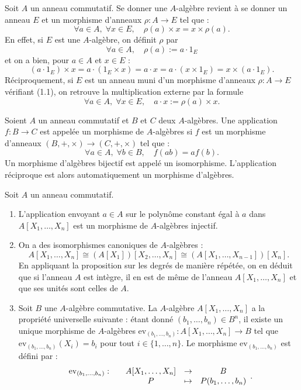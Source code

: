 \documentclass[]{report}
\begin{document}
\begin{re}{}{}
    Soit $A$ un anneau commutatif. Se donner une $A$-algèbre revient à se donner un anneau $E$ et un morphisme d'anneaux $\rho : A \to E$ tel que :
    \[\forall a \in A, \; \forall x \in E, \quad \rho(a) \times x = x \times \rho(a). \tag{1.1}\]
    En effet, si $E$ est une $A$-algèbre, on définit $\rho$ par
    \[\forall a \in A, \quad \rho(a) := a \cdot 1_E\]
    et on a bien, pour $a \in A$ et $x \in E$ :
    \[(a \cdot 1_E) \times x = a \cdot (1_E \times x) = a \cdot x = a \cdot (x \times 1_E) = x \times (a \cdot 1_E).\]
    Réciproquement, si $E$ est un anneau muni d'un morphisme d'anneaux $\rho : A \to E$ vérifiant (1.1), on retrouve la multiplication externe par la formule
    \[\forall a \in A, \; \forall x \in E, \quad a \cdot x := \rho(a) \times x.\]
\end{re}

\begin{df}{}{}
    Soient $A$ un anneau commutatif et $B$ et $C$ deux $A$-algèbres. Une application $f : B \to C$ est appelée un morphisme de $A$-algèbres si $f$ est un morphisme d'anneaux $(B, +, \times) \to (C, +, \times)$ tel que :
    \[\forall a \in A, \; \forall b \in B, \quad f(ab) = af(b).\]
    Un morphisme d'algèbres bijectif est appelé un isomorphisme. L'application réciproque est alors automatiquement un morphisme d'algèbres.
\end{df}

\begin{ex}{}{}
    Soit $A$ un anneau commutatif.
    \begin{enumerate}
        \item L'application envoyant $a \in A$ sur le polynôme constant égal à $a$ dans $A[X_1, \ldots, X_n]$ est un morphisme de $A$-algèbres injectif.
        \item On a des isomorphismes canoniques de $A$-algèbres :
        \[A[X_1, \dots, X_n] \cong (A[X_1])[X_2, \dots, X_n] \cong (A[X_1, \dots, X_{n-1}])[X_n].\]
        En appliquant la proposition sur les degrés de manière répétée, on en déduit que si l'anneau $A$ est intègre, il en est de même de l'anneau $A[X_1, \ldots, X_n]$ et que ses unités sont celles de $A$.
        \item Soit $B$ une $A$-algèbre commutative. La $A$-algèbre $A[X_1, \ldots, X_n]$ a la propriété universelle suivante : étant donné $(b_1, \ldots, b_n) \in B^n$, il existe un unique morphisme de $A$-algèbres $\mathrm{ev}_{(b_1, \ldots, b_n)} : A[X_1, \ldots, X_n] \to B$ tel que $\mathrm{ev}_{(b_1, \ldots, b_n)}(X_i) = b_i$ pour tout $i \in \{1, \ldots, n\}$. Le morphisme $\mathrm{ev}_{(b_1, \ldots, b_n)}$ est défini par :
        \[\begin{array}{ccccc} \mathrm{ev}_{(b_1, \dots, b_n)} : & & A[X_1, \dots, X_n] & \to & B \\ & & P & \mapsto & P(b_1, \dots, b_n) \end{array}.\]
    \end{enumerate}
\end{ex}
\end{document}
